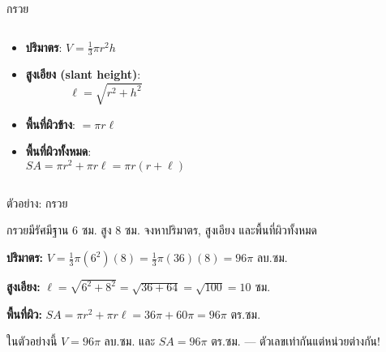 \documentclass[11pt, aspectratio=169]{beamer}
\begin{document}
\begin{frame}{กรวย}
  \begin{columns}[T]
      \centering
      \medskip\medskip\medskip\medskip\medskip\medskip

      \begin{explanation}[สูตร]
        \begin{itemize}
          \item \textbf{ปริมาตร}: $V = \frac{1}{3}\pi r^2 h$
          \item \textbf{สูงเอียง (slant height)}:
          \[
            \ell = \sqrt{r^2 + h^2}
          \]
          \item \textbf{พื้นที่ผิวข้าง}: $= \pi r \ell$
          \item \textbf{พื้นที่ผิวทั้งหมด}:
          \[
            SA = \pi r^2 + \pi r \ell = \pi r(r + \ell)
          \]
        \end{itemize}
      \end{explanation}
  \end{columns}
\end{frame}

\begin{frame}{ตัวอย่าง: กรวย}
  \begin{exambox}[โจทย์]
    กรวยมีรัศมีฐาน 6 ซม. สูง 8 ซม. จงหาปริมาตร, สูงเอียง และพื้นที่ผิวทั้งหมด
  \end{exambox}

  \begin{solbox}[วิธีทำ]
    \textbf{ปริมาตร:} $V = \frac{1}{3}\pi (6^2)(8) = \frac{1}{3}\pi (36)(8) = 96\pi$ ลบ.ซม.

    \textbf{สูงเอียง:} $\ell = \sqrt{6^2 + 8^2} = \sqrt{36+64} = \sqrt{100} = 10$ ซม.

    \textbf{พื้นที่ผิว:} $SA = \pi r^2 + \pi r \ell = 36\pi + 60\pi = 96\pi$ ตร.ซม.
  \end{solbox}

  \begin{intuition}[สังเกต!]
    ในตัวอย่างนี้ $V = 96\pi$ ลบ.ซม. และ $SA = 96\pi$ ตร.ซม. — ตัวเลขเท่ากันแต่หน่วยต่างกัน!
  \end{intuition}
\end{frame}
\end{document}
